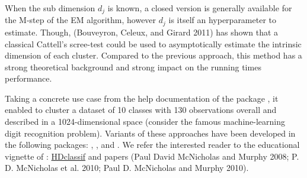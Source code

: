 When the sub dimension \(d_j\) is known, a closed version is generally available for the M-step of the EM algorithm, however \(d_j\) is itself an hyperparameter to estimate. Though, (Bouveyron, Celeux, and Girard 2011) has shown that a classical Cattell's scree-test could be used to asymptotically estimate the intrinsic dimension of each cluster. Compared to the previous approach, this method has a strong theoretical background and strong impact on the running times performance.

Taking a concrete use case from the help documentation of the package , it enabled to cluster a dataset of 10 classes with 130 observations overall and described in a 1024-dimensional space (consider the famous machine-learning digit recognition problem). Variants of these approaches have been developed in the following packages: , ,  and . We refer the interested reader to the educational vignette of : \href{https://rdrr.io/pkg/HDclassif/man/HDclassif-package.html}{HDclassif} and papers (Paul David McNicholas and Murphy 2008; P. D. McNicholas et al. 2010; Paul D. McNicholas and Murphy 2010).

\color{blue}

